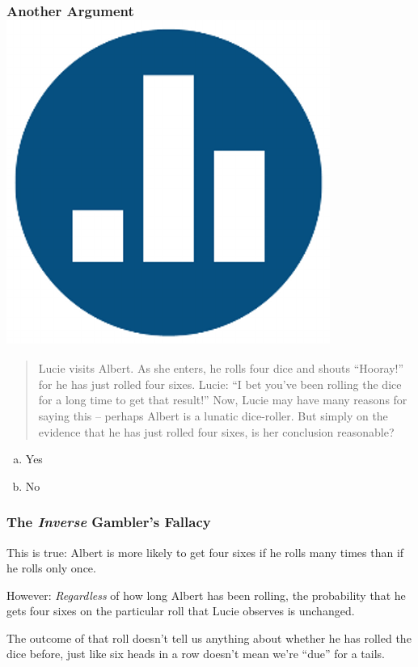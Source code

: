 \documentclass[handout]{beamer}
\begin{document}
\begin{frame}
\frametitle{Another Argument \hfill \includegraphics[scale = 0.05]{./images/clicker}}
\begin{quote}
Lucie visits Albert. As she enters, he rolls four dice and shouts ``Hooray!'' for he has just rolled four sixes. Lucie: ``I bet you've been rolling the dice for a long time to get that result!'' Now, Lucie may have many reasons for saying this -- perhaps Albert is a lunatic dice-roller. But simply on the evidence that he has just rolled four sixes, is her conclusion reasonable?
\end{quote}

\begin{enumerate}[(a)]
	\item Yes
	\item No
\end{enumerate}

\end{frame}
\begin{frame}
\frametitle{The \emph{Inverse} Gambler's Fallacy}

\begin{block}{This is true:}
Albert is more likely to get four sixes if he rolls many times than if he rolls only once.\end{block}
\begin{block}{However:} \emph{Regardless} of how long Albert has been rolling, the probability that he gets four sixes \alert{on the particular roll that Lucie observes} is unchanged. \end{block}
\vspace{2em}
\begin{block}{The outcome of that roll doesn't tell us anything about whether he has rolled the dice before, just like six heads in a row doesn't mean we're ``due'' for a tails.}\end{block}

\end{frame}
\end{document}
